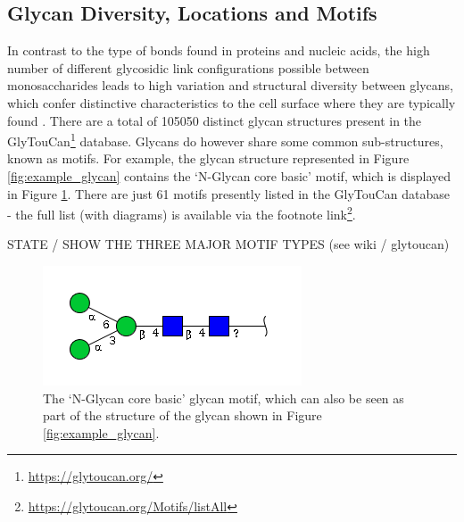 \documentclass[12pt,a4paper]{article}
\begin{document}
\subsection{Glycan Diversity, Locations and Motifs}
\label{sec:glycan_locations}
In contrast to the type of bonds found in proteins and nucleic acids, the high number of different glycosidic link configurations possible between monosaccharides leads to high variation and structural diversity between glycans, which confer distinctive characteristics to the cell surface where they are typically found \citep{10.1371/journal.pcbi.1002813}.
There are a total of 105050 distinct glycan structures present in the GlyTouCan\footnote{\url{https://glytoucan.org/}} database. Glycans do however share some common sub-structures, known as motifs. For example, the glycan structure represented in Figure \ref{fig:example_glycan} contains the `N-Glycan core basic' motif, which is displayed in Figure \ref{fig:N-Glycan core basic}. There are just 61 motifs presently listed in the GlyTouCan database - the full list (with diagrams) is available via the footnote link\footnote{\url{https://glytoucan.org/Motifs/listAll}}.

STATE / SHOW THE THREE MAJOR MOTIF TYPES (see wiki / glytoucan)

\begin{figure}[H]
\centering 
\includegraphics[scale=0.8]{images/n-glycan_core_basic.png} 
\caption{The `N-Glycan core basic' glycan motif, which can also be seen as part of the structure of the glycan shown in Figure \ref{fig:example_glycan}.}
\label{fig:N-Glycan core basic}
\end{figure}










\end{document}
